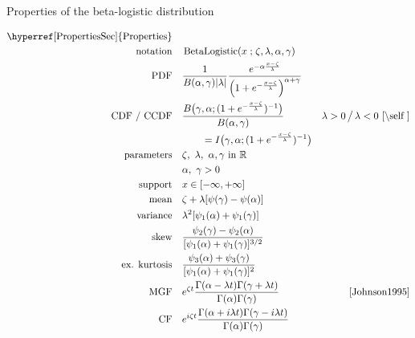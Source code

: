 

\begin{table*}[p]
\caption[Beta-logistic distribution -- Properties]{Properties of the beta-logistic distribution}
\begin{align*}
\text{\hyperref[PropertiesSec]{Properties}}  \quad& \\
\text{notation} \quad &  \op{BetaLogistic}(x\given \pLoc,\pScale,\alpha,\gamma)  
\checked
\\
\text{PDF}\quad &  
\frac{1}{B(\alpha, \gamma) \Left| \pScale\Right|}
 \frac{e^{-\alpha \frac{x-\pLoc}{\pScale} }} { \Left(1 + e^{-\frac{x-\pLoc}{\pScale}  }\Right)^{\alpha+\gamma} }
\checked 
\\
\text{CDF / CCDF} \quad  &  
 \frac{B\big(\gamma, \alpha ;  ( 1+e^{-\frac{x-\pLoc}{\pScale}} )^{-1}  \big) }{B(\alpha,\gamma)}
& \pScale>0 \, \big/ \, \pScale<0 \checked
 \text{ \cite{\self}} \\
& \qquad  = I\big(  \gamma, \alpha;  ( 1+e^{-\frac{x-\pLoc}{\pScale}} )^{-1}  \big) \checked
\\
\text{parameters}\quad &   \pLoc,\ \pScale,\ \alpha, \gamma  \text{ in } \mathbb{R} \checked \\
& \alpha,\ \gamma >0 \checked
\\
\text{support} \quad &   x \in [-\infty,+\infty] \checked
\\
\text{mean} \quad  &  \pLoc +\pScale [ \psi(\gamma)-\psi(\alpha) ]  \checked %
\\
\text{variance} \quad  & \pScale^2 [\psi_1(\alpha) + \psi_1(\gamma) ] \checked %
\\
\text{skew} \quad  &  \frac{ \psi_2(\gamma) - \psi_2(\alpha)}{[\psi_1(\alpha) + \psi_1(\gamma)]^{3/2}} \checked
\\
\text{ex. kurtosis} \quad  &   \frac{\psi_3(\alpha) + \psi_3(\gamma)}{[\psi_1(\alpha) + \psi_1(\gamma)]^{2}} \checked
\\
\text{MGF} \quad  &  e^{ \pLoc t}\frac{\Gamma(\alpha-\pScale  t) \Gamma(\gamma+\pScale t)}{\Gamma(\alpha)\Gamma(\gamma)}
& \text{\cite{Johnson1995}} \checked
\\
\text{CF} \quad  &    e^{i \pLoc t} \frac{\Gamma(\alpha+ i \pScale  t) \Gamma(\gamma-i \pScale t)}{\Gamma(\alpha)\Gamma(\gamma)} \checked
\end{align*}
\end{table*}

